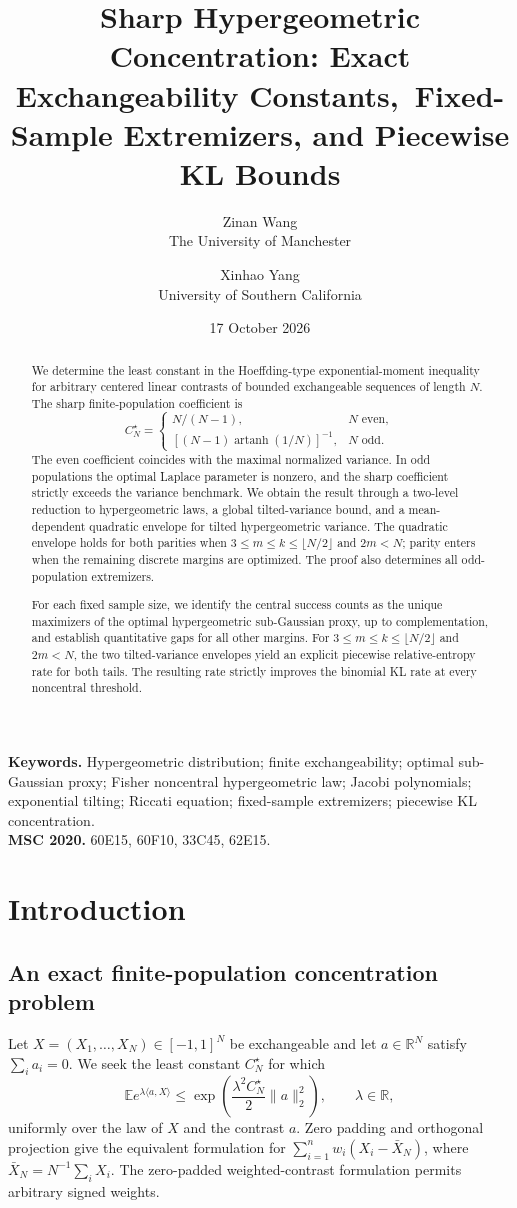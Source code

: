 \documentclass[11pt,a4paper]{article}
\title{\bfseries Sharp Hypergeometric Concentration: Exact Exchangeability Constants,\ Fixed-Sample Extremizers, and Piecewise KL Bounds}
\author{Zinan Wang\\{\small The University of Manchester}\and Xinhao Yang\\{\small University of Southern California}}
\date{17 October 2026}
\newcommand{\E}{\mathbb E}\newcommand{\R}{\mathbb R}\newcommand{\N}{\mathbb N}\newcommand{\one}{\mathbf1}
\begin{document}
\maketitle
\begin{abstract}
We determine the least constant in the Hoeffding-type exponential-moment inequality for arbitrary centered linear contrasts of bounded exchangeable sequences of length $N$. The sharp finite-population coefficient is
\[
 C_N^\star=\begin{cases}
 \displaystyle N/(N-1),&N\text{ even},\\[3pt]
 \displaystyle[(N-1)\operatorname{artanh}(1/N)]^{-1},&N\text{ odd}.
 \end{cases}
\]
The even coefficient coincides with the maximal normalized variance. In odd populations the optimal Laplace parameter is nonzero, and the sharp coefficient strictly exceeds the variance benchmark. We obtain the result through a two-level reduction to hypergeometric laws, a global tilted-variance bound, and a mean-dependent quadratic envelope for tilted hypergeometric variance. The quadratic envelope holds for both parities when $3\le m\le k\le\lfloor N/2\rfloor$ and $2m<N$; parity enters when the remaining discrete margins are optimized. The proof also determines all odd-population extremizers.

For each fixed sample size, we identify the central success counts as the unique maximizers of the optimal hypergeometric sub-Gaussian proxy, up to complementation, and establish quantitative gaps for all other margins. For $3\le m\le k\le\lfloor N/2\rfloor$ and $2m<N$, the two tilted-variance envelopes yield an explicit piecewise relative-entropy rate for both tails. The resulting rate strictly improves the binomial KL rate at every noncentral threshold.
\end{abstract}
\noindent\textbf{Keywords.} Hypergeometric distribution; finite exchangeability; optimal sub-Gaussian proxy; Fisher noncentral hypergeometric law; Jacobi polynomials; exponential tilting; Riccati equation; fixed-sample extremizers; piecewise KL concentration.\\
\textbf{MSC 2020.} 60E15, 60F10, 33C45, 62E15.
\section{Introduction}
\subsection{An exact finite-population concentration problem}
Let $X=(X_1,\ldots,X_N)\in[-1,1]^N$ be exchangeable and let $a\in\R^N$ satisfy $\sum_i a_i=0$. We seek the least constant $C_N^\star$ for which
\begin{equation}\label{eq:exchange-intro}
 \E e^{\lambda\langle a,X\rangle}
 \le\exp\left(\frac{\lambda^2C_N^\star}{2}\|a\|_2^2\right),
 \qquad \lambda\in\R,
\end{equation}
uniformly over the law of $X$ and the contrast $a$. Zero padding and orthogonal projection give the equivalent formulation for $\sum_{i=1}^n w_i(X_i-\bar X_N)$, where $\bar X_N=N^{-1}\sum_iX_i$. The zero-padded weighted-contrast formulation permits arbitrary signed weights.
\end{document}
